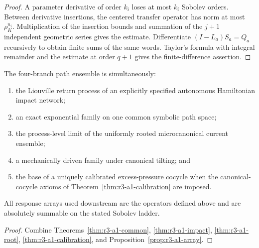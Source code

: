 \begin{proof}
A parameter derivative of order \(k_i\) loses at most \(k_i\) Sobolev
orders.  Between derivative insertions, the centered transfer operator has
norm at most \(\rho_K^{n_i}\).  Multiplication of the insertion bounds and
summation of the \(j+1\) independent geometric series gives the estimate.
Differentiate \((I-L_a)S_a=Q_a\) recursively to obtain finite sums of the
same words.  Taylor's formula with integral remainder and the estimate at
order \(q+1\) gives the finite-difference assertion.
\end{proof}

\begin{theorem}
\label{thm:r3-a1-main}
The four-branch path ensemble is simultaneously:
\begin{enumerate}[label=(\roman*)]
\item the Liouville return process of an explicitly specified autonomous
Hamiltonian impact network;
\item an exact exponential family on one common symbolic path space;
\item the process-level limit of the uniformly rooted microcanonical current
ensemble;
\item a mechanically driven family under canonical tilting; and
\item the base of a uniquely calibrated excess-pressure cocycle when the
canonical-cocycle axioms of Theorem~\ref{thm:r3-a1-calibration} are imposed.
\end{enumerate}
All response arrays used downstream are the operators defined above and are
absolutely summable on the stated Sobolev ladder.
\end{theorem}

\begin{proof}
Combine Theorems~\ref{thm:r3-a1-common},
\ref{thm:r3-a1-impact}, \ref{thm:r3-a1-root},
\ref{thm:r3-a1-calibration}, and
Proposition~\ref{prop:r3-a1-array}.
\end{proof}
